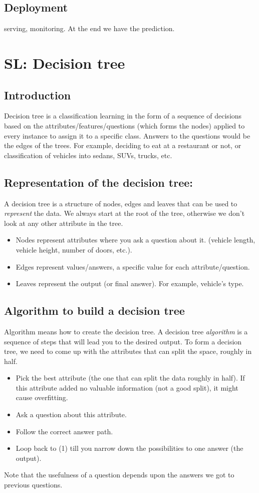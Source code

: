 \documentclass[12pt]{report}
\begin{document}
\subsection{Deployment}
serving, monitoring. At the end we have the prediction.

\section{SL: Decision tree}

\subsection{Introduction}

Decision tree is a classification learning in the form of a sequence of decisions based on the attributes/features/questions (which forms the nodes) applied to every instance to assign it to a specific class. Answers to the questions would be the edges of the trees.
For example, deciding to eat at a restaurant or not, or classification of vehicles into sedans, SUVs, trucks, etc.

\subsection{Representation of the decision tree:}

A decision tree is a structure of nodes, edges and leaves that can be used to \textit{represent} the data. We always start at the root of the tree, otherwise we don't look at any other attribute in the tree.
\begin{itemize}
\item Nodes represent attributes where you ask a question about it. (vehicle length, vehicle height, number of doors, etc.).
\item Edges represent values/answers, a specific value for each attribute/question.
\item Leaves represent the output (or final answer). For example, vehicle’s type.
\end{itemize}

\subsection{Algorithm to build a decision tree}
Algorithm means how to create the decision tree. A decision tree \textit{algorithm} is a sequence of steps that will lead you to the desired output. To form a decision tree, we need to come up with the attributes that can split the space, roughly in half.
\begin{itemize}
\item Pick the best attribute (the one that can split the data roughly in half). If this attribute added no valuable information (not a good split), it might cause overfitting.
\item Ask a question about this attribute.
\item Follow the correct answer path.
\item Loop back to (1) till you narrow down the possibilities to one answer (the output).
\end{itemize}
Note that the usefulness of a question depends upon the answers we got to previous questions.
\end{document}
